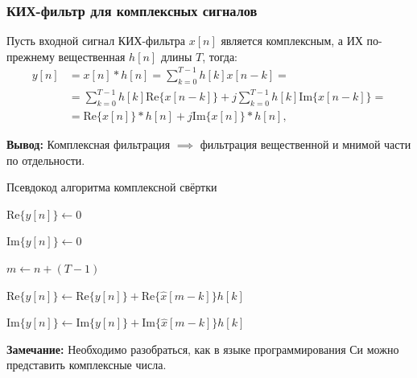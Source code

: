 \documentclass{beamer}
\begin{document}
    \begin{frame}
        \frametitle{КИХ-фильтр для комплексных сигналов}
        \justifying
        Пусть входной сигнал КИХ-фильтра $x[n]$ является комплексным, а ИХ по-прежнему вещественная $h[n]$ длины $T$, тогда:
        \begin{equation}
        \begin{split}
            y[n] &= x[n] * h[n] = \sum_{k = 0}^{T-1}h[k]x[n - k] = \\
                 &= \sum_{k = 0}^{T-1}h[k]\textrm{Re}\{x[n - k]\} + j\sum_{k = 0}^{T-1}h[k]\textrm{Im}\{x[n - k]\} = \\
                 &= \textrm{Re}\{x[n]\} * h[n] + j\textrm{Im}\{x[n]\} * h[n], \label{eq:cconv}
        \end{split}
        \end{equation}
        \par
        {\bf Вывод:} Комплексная фильтрация $\implies$ фильтрация вещественной и мнимой части по отдельности.
        \par
    \end{frame}
    \begin{frame}{Псевдокод алгоритма комплексной свёртки}
        \begin{algorithm}[H]
            \BlankLine
            {
                $\textrm{Re}\{y[n]\} \leftarrow 0$
                \par
                $\textrm{Im}\{y[n]\} \leftarrow 0$
                \par
                $m \leftarrow n + (T - 1)$
                \par
                {
                    $\textrm{Re}\{y[n]\}  \leftarrow \textrm{Re}\{y[n]\} + \textrm{Re}\{\hat x[m - k]\} h[k]$
                    \par
                    $\textrm{Im}\{y[n]\}  \leftarrow \textrm{Im}\{y[n]\} + \textrm{Im}\{\hat x[m - k]\} h[k]$
                }
            }
        \end{algorithm}
        {\bf Замечание:} Необходимо разобраться, как в языке программирования Си можно представить комплексные числа.
    \end{frame}
\end{document}
